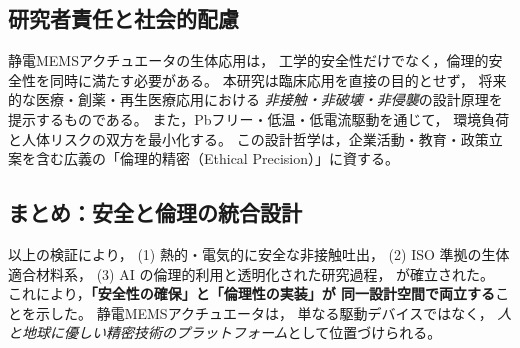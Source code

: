 \subsection{研究者責任と社会的配慮}
静電MEMSアクチュエータの生体応用は，
工学的安全性だけでなく，倫理的安全性を同時に満たす必要がある。
本研究は臨床応用を直接の目的とせず，
将来的な医療・創薬・再生医療応用における
\emph{非接触・非破壊・非侵襲}の設計原理を提示するものである。
また，Pbフリー・低温・低電流駆動を通じて，
環境負荷と人体リスクの双方を最小化する。
この設計哲学は，企業活動・教育・政策立案を含む広義の「倫理的精密（Ethical Precision）」に資する。

\subsection{まとめ：安全と倫理の統合設計}
以上の検証により，
(1) 熱的・電気的に安全な非接触吐出，  
(2) ISO 準拠の生体適合材料系，  
(3) AI の倫理的利用と透明化された研究過程，  
が確立された。
これにより，\textbf{「安全性の確保」と「倫理性の実装」が
同一設計空間で両立する}ことを示した。
静電MEMSアクチュエータは，
単なる駆動デバイスではなく，
\emph{人と地球に優しい精密技術のプラットフォーム}として位置づけられる。
